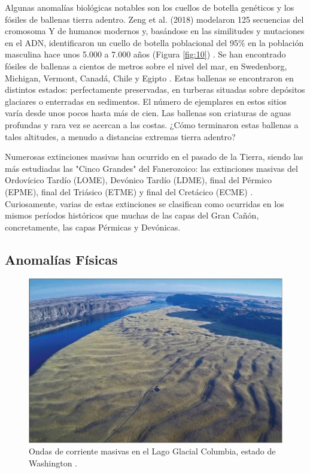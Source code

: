 \documentclass[10pt,twocolumn,letterpaper]{article}
\begin{document}
Algunas anomalías biológicas notables son los cuellos de botella genéticos y los fósiles de ballenas tierra adentro. Zeng et al. (2018) modelaron 125 secuencias del cromosoma Y de humanos modernos y, basándose en las similitudes y mutaciones en el ADN, identificaron un cuello de botella poblacional del 95\% en la población masculina hace unos 5.000 a 7.000 años (Figura \ref{fig:10}) \cite{62}. Se han encontrado fósiles de ballenas a cientos de metros sobre el nivel del mar, en Swedenborg, Michigan, Vermont, Canadá, Chile y Egipto \cite{63,64,65,66}. Estas ballenas se encontraron en distintos estados: perfectamente preservadas, en turberas situadas sobre depósitos glaciares o enterradas en sedimentos. El número de ejemplares en estos sitios varía desde unos pocos hasta más de cien. Las ballenas son criaturas de aguas profundas y rara vez se acercan a las costas. ¿Cómo terminaron estas ballenas a tales altitudes, a menudo a distancias extremas tierra adentro?

Numerosas extinciones masivas han ocurrido en el pasado de la Tierra, siendo las más estudiadas las "Cinco Grandes" del Fanerozoico: las extinciones masivas del Ordovícico Tardío (LOME), Devónico Tardío (LDME), final del Pérmico (EPME), final del Triásico (ETME) y final del Cretácico (ECME) \cite{88,89}. Curiosamente, varias de estas extinciones se clasifican como ocurridas en los mismos períodos históricos que muchas de las capas del Gran Cañón, concretamente, las capas Pérmicas y Devónicas.

\subsection{Anomalías Físicas}

\begin{figure}[b]
\begin{center}
   \includegraphics[width=1\linewidth]{columbia.jpg}
\end{center}
   \caption{Ondas de corriente masivas en el Lago Glacial Columbia, estado de Washington \cite{80}.}
\label{fig:11}
\label{fig:onecol}
\end{figure}
\end{document}
